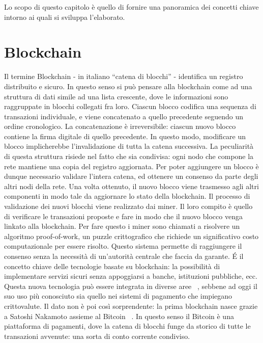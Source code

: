 
Lo scopo di questo capitolo è quello di fornire una panoramica dei concetti chiave intorno ai quali si sviluppa l'elaborato.

\section{Blockchain}

Il termine Blockchain - in italiano ``catena di blocchi'' - identifica un registro distribuito e sicuro. In questo senso si può pensare alla blockchain come ad una struttura di dati simile ad una lista crescente, dove le informazioni sono raggruppate in blocchi collegati fra loro.\newline
Ciascun blocco codifica una sequenza di transazioni individuale, e viene concatenato a quello precedente seguendo un ordine cronologico. La concatenazione è irreversibile: ciascun nuovo blocco contiene la firma digitale di quello precedente. In questo modo, modificare un blocco implicherebbe l'invalidazione di tutta la catena successiva.\newline  
La peculiarità di questa struttura risiede nel fatto che sia condivisa: ogni nodo che compone la rete mantiene una copia del registro aggiornata. Per poter aggiungere un blocco è dunque necessario validare l'intera catena, ed ottenere un consenso da parte degli altri nodi della rete. Una volta ottenuto, il nuovo blocco viene trasmesso agli altri componenti in modo tale da aggiornare lo stato della blockchain.\newline
Il processo di validazione dei nuovi blocchi viene realizzato dai miner.
Il loro compito è quello di verificare le transazioni proposte e fare in modo che il nuovo blocco venga linkato alla blockchain. Per fare questo i miner sono chiamati a risolvere un algoritmo proof-of-work, un puzzle crittografico che richiede un significativo costo computazionale per essere risolto.\newline
Questo sistema permette di raggiungere il consenso senza la necessità di un'autorità centrale che faccia da garante. \'E il concetto chiave delle tecnologie basate su blockchain: la possibilità di implementare servizi sicuri senza appoggiarsi a banche, istituzioni pubbliche, ecc.\newline
\newline
Questa nuova tecnologia può essere integrata in diverse aree ~\cite{iansiti_lakhani_2017}, sebbene ad oggi il suo uso più conosciuto sia quello nei sistemi di pagamento che impiegano crittovalute.
Il dato non è poi così sorprendente: la prima blockchain nasce grazie a Satoshi Nakamoto assieme al Bitcoin ~\cite{nakamoto2008bitcoin}. In questo senso il Bitcoin è una
piattaforma di pagamenti, dove la catena di blocchi funge da storico di tutte le transazioni avvenute: una sorta di conto corrente condiviso.\newline

